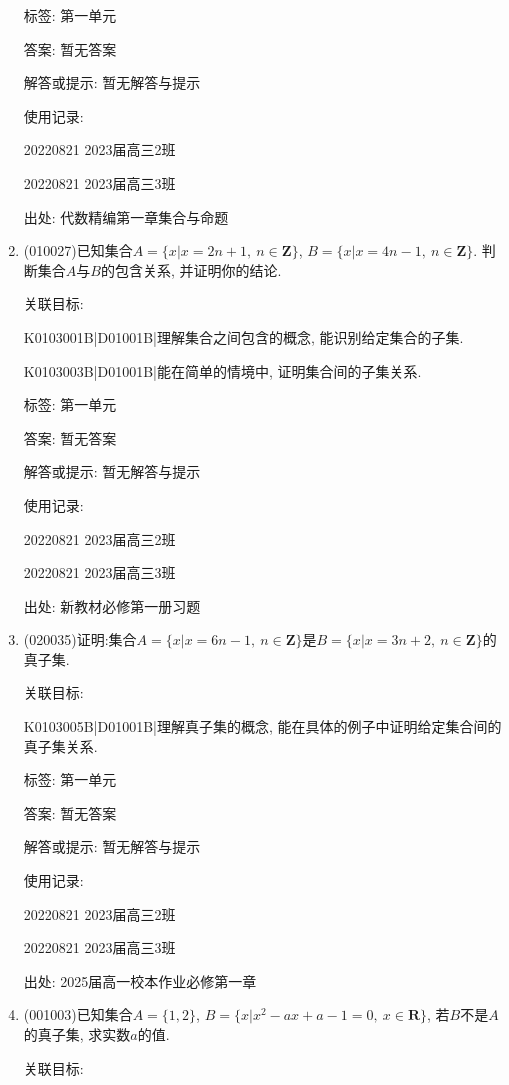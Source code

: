 \documentclass[10pt,a4paper]{article}
\begin{document}
\begin{enumerate}[1.]
标签: 第一单元

答案: 暂无答案

解答或提示: 暂无解答与提示

使用记录:

20220821	2023届高三2班	

20220821	2023届高三3班	


出处: 代数精编第一章集合与命题
\item { (010027)}已知集合$A=\{x|x=2n+1,\ n\in \mathbf{Z}\}$, $B=\{x|x=4n-1,\ n\in \mathbf{Z}\}$. 判断集合$A$与$B$的包含关系, 并证明你的结论.


关联目标:

K0103001B|D01001B|理解集合之间包含的概念, 能识别给定集合的子集.

K0103003B|D01001B|能在简单的情境中, 证明集合间的子集关系.



标签: 第一单元

答案: 暂无答案

解答或提示: 暂无解答与提示

使用记录:

20220821	2023届高三2班	

20220821	2023届高三3班	


出处: 新教材必修第一册习题
\item { (020035)}证明:集合$A=\{x|x=6n-1, \ n\in\mathbf{Z}\}$是$B=\{x|x=3n+2, \ n\in\mathbf{Z}\}$的真子集.


关联目标:

K0103005B|D01001B|理解真子集的概念, 能在具体的例子中证明给定集合间的真子集关系.



标签: 第一单元

答案: 暂无答案

解答或提示: 暂无解答与提示

使用记录:

20220821	2023届高三2班	

20220821	2023届高三3班	


出处: 2025届高一校本作业必修第一章
\item { (001003)}已知集合$A=\{1,2\}$, $B=\{x|x^2-ax+a-1=0,\ x\in\mathbf{R}\}$, 若$B$不是$A$的真子集, 求实数$a$的值.


关联目标:


\end{enumerate}
\end{document}
